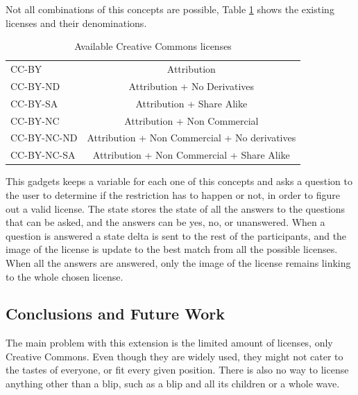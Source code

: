 Not all combinations of this concepts are possible, Table \ref{fig:cc_licenses} shows the existing licenses and their denominations.
\begin{table}[H]
  \begin{center}
    \begin{tabular}{ | l | c |}
      \hline
      CC-BY & Attribution\\
      CC-BY-ND & Attribution + No Derivatives\\      
      CC-BY-SA & Attribution + Share Alike\\
      CC-BY-NC & Attribution + Non Commercial\\
      CC-BY-NC-ND & Attribution + Non Commercial + No derivatives\\
      CC-BY-NC-SA & Attribution + Non Commercial + Share Alike\\
      \hline
    \end{tabular}
  \end{center}
  \caption{Available Creative Commons licenses}
  \label{fig:cc_licenses}
\end{table}
This gadgets keeps a variable for each one of this concepts and asks a question to the user to determine if the restriction has to happen or not, in order to figure out a valid license. The state stores the state of all the answers to the questions that can be asked, and the answers can be yes, no, or unanswered. When a question is answered a state delta is sent to the rest of the participants, and the image of the license is update to the best match from all the possible licenses. When all the answers are answered, only the image of the license remains linking to the whole chosen license.\\[.2cm]
\subsection{Conclusions and Future Work}
The main problem with this extension is the limited amount of licenses, only Creative Commons. Even though they are widely used, they might not cater to the tastes of everyone, or fit every given position. There is also no way to license anything other than a blip, such as a blip and all its children or a whole wave.
